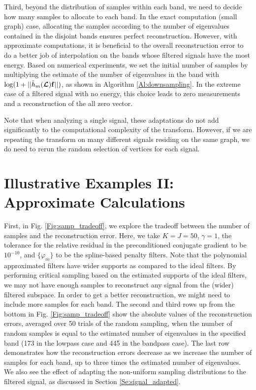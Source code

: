 \documentclass[journal, 10pt]{IEEEtran}
\begin{document}
Third, beyond the distribution of samples within each band, we need to decide how many samples to allocate to each band. In the exact computation (small graph) case, allocating the samples according to the number of eigenvalues contained in the disjoint bands ensures perfect reconstruction. However, with approximate computations, it is beneficial to the overall reconstruction error to do a better job of interpolation on the bands whose filtered signals have the most energy. Based on numerical experiments, we set the initial number of samples by multiplying the estimate of the number of eigenvalues in the band with $\log(1+||\tilde{h}_m(\boldsymbol{\mathcal{L}}){\bf f}||)$, as shown in Algorithm \ref{Al:downsampling}. In the extreme case of a filtered signal with no energy, this choice leads to zero measurements and a reconstruction of the all zero vector.

Note that when analyzing a single signal, these adaptations do not add significantly to the computational complexity of the transform. However, if we are repeating the transform on many different signals residing on the same graph, we do need to rerun the random selection of vertices for each signal.





\section{Illustrative Examples II: Approximate Calculations} \label{Se:ill2}

First, in Fig. \ref{Fig:samp_tradeoff}, we explore the tradeoff between the number of samples and the reconstruction error.  Here, we take $K=J=50$, $\gamma=1$, the tolerance for the relative residual in the preconditioned conjugate gradient to be $10^{-10}$, and $\{\varphi_m\}$ to be the spline-based penalty filters.  Note that the polynomial approximated filters have wider supports as compared to the ideal filters. By performing critical sampling based on the estimated supports of the ideal filters, we may not have enough samples to reconstruct any signal from the (wider) filtered subspace. %
In order to get a better reconstruction, we might need to include more samples for each band. The second and third rows up from the bottom in Fig. \ref{Fig:samp_tradeoff} show the absolute values of the reconstruction errors, averaged over 50 trials of the random sampling, when the number of random samples is equal to the estimated number of eigenvalues in the specified band (173 in the lowpass case and 445 in the bandpass case). The last row demonstrates how the 
reconstruction errors decrease as we increase the number of samples for each band, up to three times the estimated number of eigenvalues. We also see the effect of adapting the non-uniform sampling distributions to the filtered signal, as discussed in Section \ref{Se:signal_adapted}. %
\end{document}

